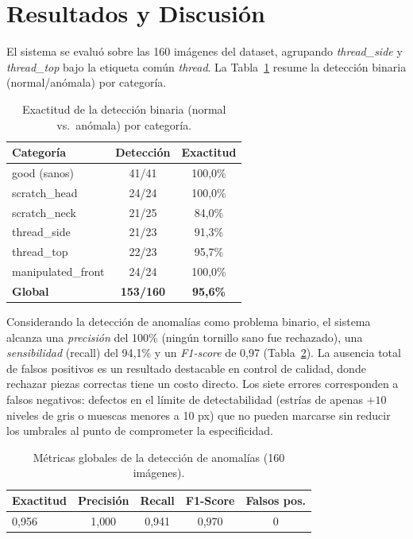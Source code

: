 \documentclass[final]{article}
\begin{document}
\section{Resultados y Discusión}

El sistema se evaluó sobre las 160 imágenes del dataset, agrupando
\emph{thread\_side} y \emph{thread\_top} bajo la etiqueta común \emph{thread}.
La Tabla~\ref{tab:binario} resume la detección binaria (normal/anómala) por
categoría.

\begin{table}[h]
\centering
\caption{Exactitud de la detección binaria (normal vs.\ anómala) por categoría.}
\label{tab:binario}
\begin{tabular}{lcc}
\toprule
\textbf{Categoría} & \textbf{Detección} & \textbf{Exactitud} \\
\midrule
good (sanos)        & 41/41 & 100{,}0\% \\
scratch\_head       & 24/24 & 100{,}0\% \\
scratch\_neck       & 21/25 & 84{,}0\% \\
thread\_side        & 21/23 & 91{,}3\% \\
thread\_top         & 22/23 & 95{,}7\% \\
manipulated\_front  & 24/24 & 100{,}0\% \\
\midrule
\textbf{Global}     & \textbf{153/160} & \textbf{95{,}6\%} \\
\bottomrule
\end{tabular}
\end{table}

Considerando la detección de anomalías como problema binario, el sistema
alcanza una \emph{precisión} del 100\% (ningún tornillo sano fue rechazado),
una \emph{sensibilidad} (recall) del 94{,}1\% y un \emph{F1-score} de 0{,}97
(Tabla~\ref{tab:metricas}). La ausencia total de falsos positivos es un
resultado destacable en control de calidad, donde rechazar piezas correctas
tiene un costo directo. Los siete errores corresponden a falsos negativos:
defectos en el límite de detectabilidad (estrías de apenas $+10$ niveles de
gris o muescas menores a 10 px) que no pueden marcarse sin reducir los umbrales
al punto de comprometer la especificidad.

\begin{table}[h]
\centering
\caption{Métricas globales de la detección de anomalías (160 imágenes).}
\label{tab:metricas}
\begin{tabular}{lcccc}
\toprule
\textbf{Exactitud} & \textbf{Precisión} & \textbf{Recall} & \textbf{F1-Score} & \textbf{Falsos pos.} \\
\midrule
0{,}956 & 1{,}000 & 0{,}941 & 0{,}970 & 0 \\
\bottomrule
\end{tabular}
\end{table}
\end{document}
